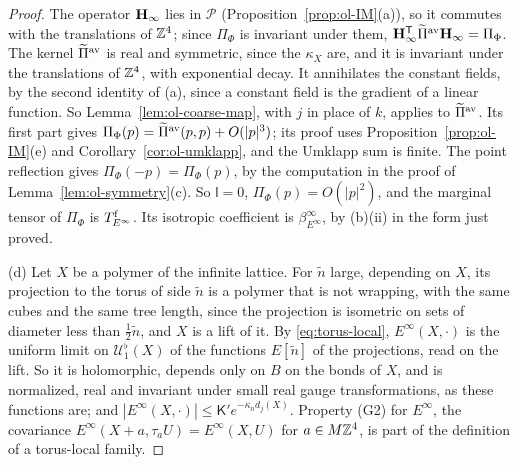 \begin{proof}
The operator $\mathbf H_\infty$ lies in $\mathscr P$ (Proposition~\ref{prop:ol-IM}(a)), so it commutes with the translations of $\mathbb Z^4$; since $\Pi_\Phi$ is invariant under them, $\mathbf H_\infty^{\sf T}\widetilde\Pi^{\rm av}\mathbf H_\infty=\Pi_\Phi$. The kernel $\widetilde\Pi^{\rm av}$ is real and symmetric, since the $\kappa_X$ are, and it is invariant under the translations of $\mathbb Z^4$, with exponential decay. It annihilates the constant fields, by the second identity of (a), since a constant field is the gradient of a linear function. So Lemma~\ref{lem:ol-coarse-map}, with $j$ in place of $k$, applies to $\widetilde\Pi^{\rm av}$. Its first part gives $\Pi_\Phi(p)=\widetilde\Pi^{\rm av}(p,p)+O(|p|^3)$; its proof uses Proposition~\ref{prop:ol-IM}(e) and Corollary~\ref{cor:ol-umklapp}, and the Umklapp sum is finite. The point reflection gives $\Pi_\Phi(-p)=\Pi_\Phi(p)$, by the computation in the proof of Lemma~\ref{lem:ol-symmetry}(c). So $\mathsf l=0$, $\Pi_\Phi(p)=O(|p|^2)$, and the marginal tensor of $\Pi_\Phi$ is $T^{\rm f}_{E^\infty}$. Its isotropic coefficient is $\beta^\infty_{E^\infty}$, by (b)(ii) in the form just proved.

(d) Let $X$ be a polymer of the infinite lattice. For $\tilde n$ large, depending on $X$, its projection to the torus of side $\tilde n$ is a polymer that is not wrapping, with the same cubes and the same tree length, since the projection is isometric on sets of diameter less than $\frac12\tilde n$, and $X$ is a lift of it. By \eqref{eq:torus-local}, $E^\infty(X,\cdot)$ is the uniform limit on $\mathcal U^\flat_1(X)$ of the functions $E[\tilde n]$ of the projections, read on the lift. So it is holomorphic, depends only on $B$ on the bonds of $X$, and is normalized, real and invariant under small real gauge transformations, as these functions are; and $|E^\infty(X,\cdot)|\le\mathsf K'e^{-\kappa_nd_j(X)}$. Property (G2) for $E^\infty$, the covariance $E^\infty(X+a,\tau_aU)=E^\infty(X,U)$ for $a\in M\mathbb Z^4$, is part of the definition of a torus-local family.


\end{proof}
